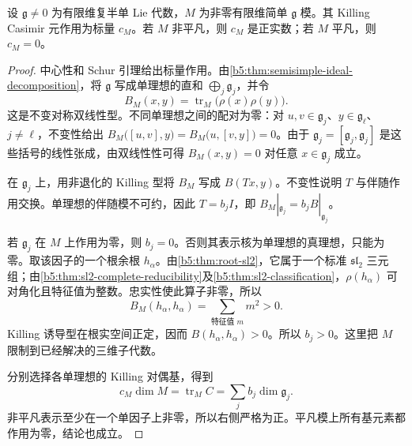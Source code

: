 \begin{lemma}\label{b5:lem:casimir-positive-simple}
	设 \(\mathfrak g\ne0\) 为有限维复半单 Lie 代数，\(M\) 为非零有限维简单 \(\mathfrak g\) 模。其 Killing Casimir 元作用为标量 \(c_M\)。若 \(M\) 非平凡，则 \(c_M\) 是正实数；若 \(M\) 平凡，则 \(c_M=0\)。
\end{lemma}
\begin{proof}
	中心性和 Schur 引理给出标量作用。由\cref{b5:thm:semisimple-ideal-decomposition}，将 \(\mathfrak g\) 写成单理想的直和 \(\bigoplus_j\mathfrak g_j\)，并令
	\[
		B_M(x,y)=\operatorname{tr}_M\bigl(\rho(x)\rho(y)\bigr).
	\]
	这是不变对称双线性型。不同单理想之间的配对为零：对 \(u,v\in\mathfrak g_j\)、\(y\in\mathfrak g_\ell\)、\(j\ne\ell\)，不变性给出 \(B_M\bigl([u,v],y\bigr)=B_M\bigl(u,[v,y]\bigr)=0\)。由于 \(\mathfrak g_j=[\mathfrak g_j,\mathfrak g_j]\) 是这些括号的线性张成，由双线性性可得 \(B_M(x,y)=0\) 对任意 \(x\in\mathfrak g_j\) 成立。

	在 \(\mathfrak g_j\) 上，用非退化的 Killing 型将 \(B_M\) 写成 \(B(Tx,y)\)。不变性说明 \(T\) 与伴随作用交换。单理想的伴随模不可约，因此 \(T=b_jI\)，即 \(B_M|_{\mathfrak g_j}=b_jB|_{\mathfrak g_j}\)。

	若 \(\mathfrak g_j\) 在 \(M\) 上作用为零，则 \(b_j=0\)。否则其表示核为单理想的真理想，只能为零。取该因子的一个根余根 \(h_\alpha\)。由\cref{b5:thm:root-sl2}，它属于一个标准 \(\mathfrak{sl}_2\) 三元组；由\cref{b5:thm:sl2-complete-reducibility}及\cref{b5:thm:sl2-classification}，\(\rho(h_\alpha)\) 可对角化且特征值为整数。忠实性使此算子非零，所以
	\[
		B_M(h_\alpha,h_\alpha) =\sum_{\text{特征值 }m}m^2>0.
	\]
	Killing 诱导型在根实空间正定，因而 \(B(h_\alpha,h_\alpha)>0\)。所以 \(b_j>0\)。这里把 \(M\) 限制到已经解决的三维子代数。

	分别选择各单理想的 Killing 对偶基，得到
	\[
		c_M\dim M=\operatorname{tr}_M C =\sum_j b_j\dim\mathfrak g_j.
	\]
	非平凡表示至少在一个单因子上非零，所以右侧严格为正。平凡模上所有基元素都作用为零，结论也成立。
\end{proof}

